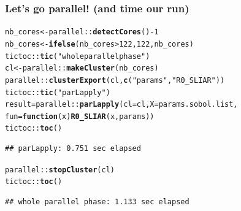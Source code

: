 \documentclass[aspectratio=169]{beamer}\usepackage[]{graphicx}\usepackage[]{xcolor}
\makeatletter
\newcommand{\hlnum}[1]{\textcolor[rgb]{0.686,0.059,0.569}{#1}}%
\newcommand{\hlsng}[1]{\textcolor[rgb]{0.192,0.494,0.8}{#1}}%
\newcommand{\hlopt}[1]{\textcolor[rgb]{0,0,0}{#1}}%
\newcommand{\hldef}[1]{\textcolor[rgb]{0.345,0.345,0.345}{#1}}%
\newcommand{\hlkwa}[1]{\textcolor[rgb]{0.161,0.373,0.58}{\textbf{#1}}}%
\newcommand{\hlkwb}[1]{\textcolor[rgb]{0.69,0.353,0.396}{#1}}%
\newcommand{\hlkwc}[1]{\textcolor[rgb]{0.333,0.667,0.333}{#1}}%
\newcommand{\hlkwd}[1]{\textcolor[rgb]{0.737,0.353,0.396}{\textbf{#1}}}%
\newenvironment{kframe}{%
 \def\at@end@of@kframe{}%
 \ifinner\ifhmode%
  \def\at@end@of@kframe{\end{minipage}}%
  \begin{minipage}{\columnwidth}%
 \fi\fi%
 \def\FrameCommand##1{\hskip\@totalleftmargin \hskip-\fboxsep
 \colorbox{shadecolor}{##1}\hskip-\fboxsep
     \hskip-\linewidth \hskip-\@totalleftmargin \hskip\columnwidth}%
 \MakeFramed {\advance\hsize-\width
   \@totalleftmargin\z@ \linewidth\hsize
   \@setminipage}}%
 {\par\unskip\endMakeFramed%
 \at@end@of@kframe}
\newenvironment{knitrout}{}{} %
\makeatother
\begin{document}
\begin{frame}[fragile]\frametitle{Let's go parallel! (and time our run)}
\begin{knitrout}
\color{fgcolor}\begin{kframe}
\begin{alltt}
\hldef{nb_cores} \hlkwb{<-} \hldef{parallel}\hlopt{::}\hlkwd{detectCores}\hldef{()} \hlopt{-} \hlnum{1}
\hldef{nb_cores} \hlkwb{<-} \hlkwd{ifelse}\hldef{(nb_cores} \hlopt{>} \hlnum{122}\hldef{,} \hlnum{122}\hldef{, nb_cores)}
\hldef{tictoc}\hlopt{::}\hlkwd{tic}\hldef{(}\hlsng{"whole parallel phase"}\hldef{)}
\hldef{cl} \hlkwb{<-} \hldef{parallel}\hlopt{::}\hlkwd{makeCluster}\hldef{(nb_cores)}
\hldef{parallel}\hlopt{::}\hlkwd{clusterExport}\hldef{(cl,} \hlkwd{c}\hldef{(}\hlsng{"params"}\hldef{,} \hlsng{"R0_SLIAR"}\hldef{))}
\hldef{tictoc}\hlopt{::}\hlkwd{tic}\hldef{(}\hlsng{"parLapply"}\hldef{)}
\hldef{result} \hlkwb{=} \hldef{parallel}\hlopt{::}\hlkwd{parLapply}\hldef{(}\hlkwc{cl} \hldef{= cl,} \hlkwc{X} \hldef{= params.sobol.list,}
                             \hlkwc{fun} \hldef{=}  \hlkwa{function}\hldef{(}\hlkwc{x}\hldef{)} \hlkwd{R0_SLIAR}\hldef{(x, params))}
\hldef{tictoc}\hlopt{::}\hlkwd{toc}\hldef{()}
\end{alltt}
\begin{verbatim}
## parLapply: 0.751 sec elapsed
\end{verbatim}
\begin{alltt}
\hldef{parallel}\hlopt{::}\hlkwd{stopCluster}\hldef{(cl)}
\hldef{tictoc}\hlopt{::}\hlkwd{toc}\hldef{()}
\end{alltt}
\begin{verbatim}
## whole parallel phase: 1.133 sec elapsed
\end{verbatim}
\end{kframe}
\end{knitrout}
\end{frame}
\end{document}
